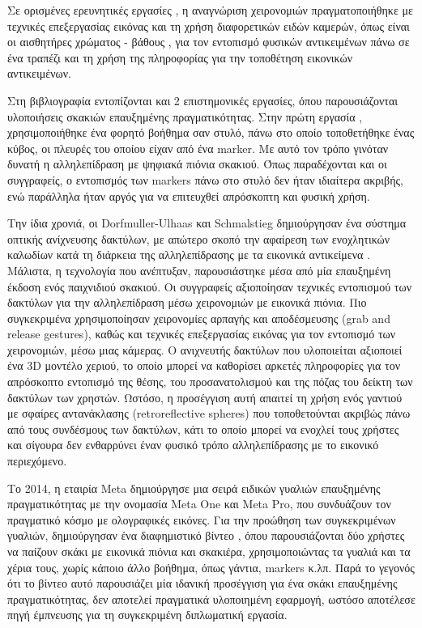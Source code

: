 Σε ορισμένες ερευνητικές εργασίες \cite{Lee2010} \cite{storring2004computer} \cite{Lee20093D} \cite{billinghurst2014hands} \cite{Regenbrecht2013}, η αναγνώριση χειρονομιών πραγματοποιήθηκε με τεχνικές επεξεργασίας εικόνας και τη χρήση διαφορετικών ειδών καμερών, όπως είναι οι αισθητήρες χρώματος - βάθους \cite{clark2011} \cite{Ha2014} \cite{piumsomboon2011} \cite{piumsomboon2014}, για τον εντοπισμό φυσικών αντικειμένων πάνω σε ένα τραπέζι και τη χρήση της πληροφορίας για την τοποθέτηση εικονικών αντικειμένων. 



Στη βιβλιογραφία εντοπίζονται και 2 επιστημονικές εργασίες, όπου παρουσιάζονται υλοποιήσεις σκακιών επαυξημένης πραγματικότητας. Στην πρώτη εργασία \cite{Reitmayr2001}, χρησιμοποιήθηκε ένα φορητό βοήθημα σαν στυλό, πάνω στο οποίο τοποθετήθηκε ένας κύβος, οι πλευρές του οποίου είχαν από ένα marker. Με αυτό τον τρόπο γινόταν δυνατή η αλληλεπίδραση με ψηφιακά πιόνια σκακιού. Όπως παραδέχονται και οι συγγραφείς, ο εντοπισμός των markers πάνω στο στυλό δεν ήταν ιδιαίτερα ακριβής, ενώ παράλληλα ήταν αργός για να επιτευχθεί απρόσκοπτη και φυσική χρήση.


Την ίδια χρονιά, οι Dorfmuller-Ulhaas και Schmalstieg δημιούργησαν ένα σύστημα οπτικής ανίχνευσης δακτύλων, με απώτερο σκοπό την αφαίρεση των ενοχλητικών καλωδίων κατά τη διάρκεια της αλληλεπίδρασης με τα εικονικά αντικείμενα \cite{Dorfmuller-Ulhaas2001}. Μάλιστα, η τεχνολογία που ανέπτυξαν, παρουσιάστηκε μέσα από μία επαυξημένη έκδοση ενός παιχνιδιού σκακιού. Οι συγγραφείς αξιοποίησαν τεχνικές εντοπισμού των δακτύλων για την αλληλεπίδραση μέσω χειρονομιών με εικονικά πιόνια.  Πιο συγκεκριμένα χρησιμοποίησαν χειρονομίες αρπαγής και αποδέσμευσης (grab and release gestures), καθώς και τεχνικές επεξεργασίας εικόνας για τον εντοπισμό των χειρονομιών, μέσω μιας κάμερας. Ο ανιχνευτής δακτύλων που υλοποιείται αξιοποιεί ένα 3D μοντέλο χεριού, το οποίο μπορεί να καθορίσει αρκετές πληροφορίες για τον απρόσκοπτο εντοπισμό της θέσης, του προσανατολισμού και της πόζας του δείκτη των δακτύλων των χρηστών. Ωστόσο, η προσέγγιση αυτή απαιτεί τη χρήση ενός γαντιού με σφαίρες αντανάκλασης (retroreflective spheres) που τοποθετούνται ακριβώς πάνω από τους συνδέσμους των δακτύλων, κάτι το οποίο μπορεί να ενοχλεί τους χρήστες και σίγουρα δεν ενθαρρύνει έναν φυσικό τρόπο αλληλεπίδρασης με το εικονικό περιεχόμενο. 



Το 2014, η εταιρία Meta δημιούργησε μια σειρά ειδικών γυαλιών επαυξημένης πραγματικότητας με την ονομασία Meta One και Meta Pro, που συνδυάζουν τον πραγματικό κόσμο με ολογραφικές εικόνες. Για την προώθηση των συγκεκριμένων γυαλιών, δημιούργησαν ένα διαφημιστικό βίντεο \cite{metaglasses}, όπου παρουσιάζονται δύο χρήστες να παίζουν σκάκι με εικονικά πιόνια και σκακιέρα, χρησιμοποιώντας τα γυαλιά και τα χέρια τους, χωρίς κάποιο άλλο βοήθημα, όπως γάντια, markers κ.λπ. Παρά το γεγονός ότι το βίντεο αυτό παρουσιάζει μία ιδανική προσέγγιση για ένα σκάκι επαυξημένης πραγματικότητας, δεν αποτελεί πραγματικά υλοποιημένη εφαρμογή, ωστόσο αποτέλεσε πηγή έμπνευσης για τη συγκεκριμένη διπλωματική εργασία.




